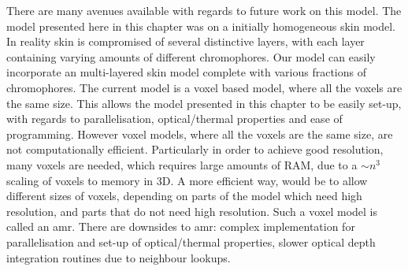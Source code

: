 There are many avenues available with regards to future work on this model. The model presented here in this chapter was on a initially homogeneous skin model. In reality skin is compromised of several distinctive layers, with each layer containing varying amounts of different chromophores. Our model can easily incorporate an multi-layered skin model complete with various fractions of chromophores.
The current model is a voxel based model, where all the voxels are the same size. This allows the model presented in this chapter to be easily set-up, with regards to parallelisation, optical/thermal properties and ease of programming. However voxel models, where all the voxels are the same size, are not computationally efficient. Particularly in order to achieve good resolution, many voxels are needed, which requires large amounts of RAM, due to a $\sim n^3$ scaling of voxels to memory in 3D. A more efficient way, would be to allow different sizes of voxels, depending on parts of the model which need high resolution, and parts that do not need high resolution. Such a voxel model is called an \gls{amr}. There are downsides to \gls{amr}: complex implementation for parallelisation and set-up of optical/thermal properties, slower optical depth integration routines due to neighbour lookups.


